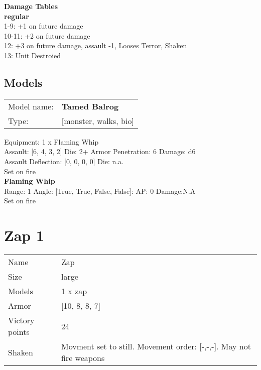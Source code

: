 {\bf Damage Tables} \\
 {\bf regular } \\
1-9: +1 on future damage \\
10-11: +2 on future damage \\
12: +3 on future damage, assault -1, Looses Terror, Shaken \\
13: Unit Destroied \\


\pagebreak

\subsection{ Models }

\begin{tabular}{ll}
Model name: & {\bf Tamed Balrog } \\
Type: & [monster, walks, bio] \\
\end{tabular}

Equipment: 1 x Flaming Whip \\

Assault: [6, 4, 3, 2] Die: 2+ Armor Penetration: 6 Damage: d6 \\
Assault Deflection: [0, 0, 0, 0] Die: n.a.\\
\indent Set on fire\\ 
 



{\bf Flaming Whip } \\



Range: 1  Angle: [True, True, False, False]: AP: 0 Damage:N.A \\
Set on fire\\ 




 















\pagebreak\pagebreak

\section{ Zap 1 }

\begin{tabular}{ll}
  Name & Zap \\
  Size & large\\
  Models & 1 x zap\\
  Armor & [10, 8, 8, 7]\\
  Victory points & 24\\
  Shaken & Movment set to still. Movement order: [-,-,-]. May not fire weapons\\
\end{tabular}

